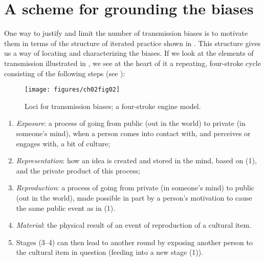 \section{A scheme for grounding the biases}


One way to justify and limit the number of transmission 
biases is to motivate them in terms of the structure of iterated practice shown in . This structure gives us a way of locating and characterizing the biases. 
If we look at the elements of transmission illustrated in , we see 
at the heart of it a repeating, four-stroke cycle consisting of the following steps (see ): 



\begin{figure}[h]
\texttt{[image: figures/ch02fig02]}
\caption{Loci for transmission biases; a four-stroke engine model.}
\label{fourstroke}
\end{figure}


\begin{enumerate}
 
\item \textit{Exposure}: a process of going from public (out in the world) to private (in someone's mind), 
when a person comes into contact with, and 
perceives or engages with, a bit of culture;



\item \textit{Representation}: how an idea is created and stored in the mind, based on (1), and the private product of this process;



\item \textit{Reproduction}: a process of going from private (in someone's mind) to public (out in the world), 
made possible in part by a person's motivation to cause the same 
public event as in (1). 



\item \textit{Material}: the physical result of an 
event of reproduction of a cultural item.



\item Stages (3--4) can then lead to another round by exposing another 
person to the cultural item in question (feeding into a new stage (1)). 

\end{enumerate}








